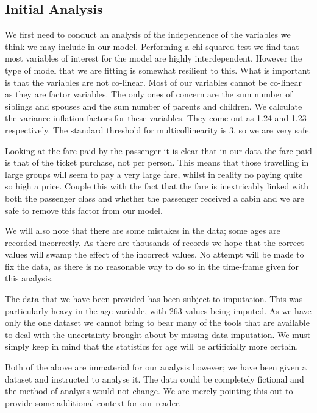 \documentclass[9pt]{extarticle}
\begin{document}
\subsection{Initial Analysis}

We first need to conduct an analysis of the independence of the variables we think we may include in our model. Performing a chi squared test we find that most variables of interest for the model are highly interdependent. However the type of model that we are fitting is somewhat resilient to this. What is important is that the variables are not co-linear. Most of our variables cannot be co-linear as they are factor variables. The only ones of concern are the sum number of siblings and spouses and the sum number of parents and children. We calculate the variance inflation factors for these variables. They come out as 1.24 and 1.23 respectively. The standard threshold for multicollinearity is 3, so we are very safe.

Looking at the fare paid by the passenger it is clear that in our data the fare paid is that of the ticket purchase, not per person. This means that those travelling in large groups will seem to pay a very large fare, whilst in reality no paying quite so high a price. Couple this with the fact that the fare is inextricably linked with both the passenger class and whether the passenger received a cabin and we are safe to remove this factor from our model. 

We will also note that there are some mistakes in the data; some ages are recorded incorrectly. As there are thousands of records we hope that the correct values will swamp the effect of the incorrect values. No attempt will be made to fix the data, as there is no reasonable way to do so in the time-frame given for this analysis.

The data that we have been provided has been subject to imputation. This was particularly heavy in the age variable, with 263 values being imputed. As we have only the one dataset we cannot bring to bear many of the tools that are available to deal with the uncertainty brought about by missing data imputation. We must simply keep in mind that the statistics for age will be artificially more certain.

Both of the above are immaterial for our analysis however; we have been given a dataset and instructed to analyse it. The data could be completely fictional and the method of analysis would not change. We are merely pointing this out to provide some additional context for our reader.
\end{document}
